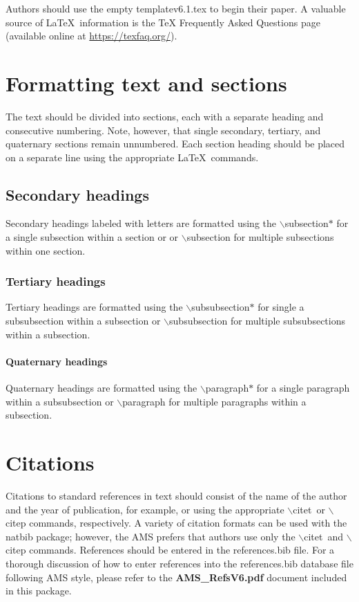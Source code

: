 \documentclass{ametsocV6.1}
\begin{document}
Authors should use the empty templatev6.1.tex to begin their
paper. A valuable source of \LaTeX\ information is the {TeX
Frequently Asked Questions} page (available online at \url{https://texfaq.org/}).

\section{Formatting text and sections}
The text should be divided into sections, each with a separate heading and
consecutive numbering. Note, however, that single secondary, tertiary, and
quaternary sections remain unnumbered. Each section heading should be placed
on a separate line using the appropriate \LaTeX\ commands.

\subsection*{Secondary headings}
Secondary headings labeled with letters are formatted using the
$\backslash$subsection$*${\tt\string{\string}} for a single
subsection within a section or
or $\backslash$subsection{\tt\string{\string}}
for multiple
subsections within one section.

\subsubsection*{Tertiary headings}
Tertiary headings are formatted using the
$\backslash$subsubsection$*${\tt\string{\string}} for single a subsubsection
within a subsection or
$\backslash$subsubsection{\tt\string{\string}}
for multiple subsubsections
within a subsection.

\paragraph*{Quaternary headings}
Quaternary headings are formatted using the
$\backslash$paragraph$*${\tt\string{\string}} for a single paragraph within
a subsubsection or
$\backslash$paragraph{\tt\string{\string}}
for multiple paragraphs
within a subsection.

\section{Citations}
Citations to standard references in text should consist of the name of the
author and the year of publication, for example, \citet{Becker+Schmitz2003} or
\citep{Becker+Schmitz2003} using the appropriate $\backslash$citet\ or
$\backslash$citep commands, respectively. A variety of citation formats can
be used with the natbib package; however, the AMS prefers that authors use only the $\backslash$citet\ and
$\backslash$citep commands. References should be entered in the references.bib file. For a thorough
discussion of how to enter references into the references.bib database file
following AMS style, please refer to the \textbf{AMS\_RefsV6.pdf} document
included in this package.
\end{document}
